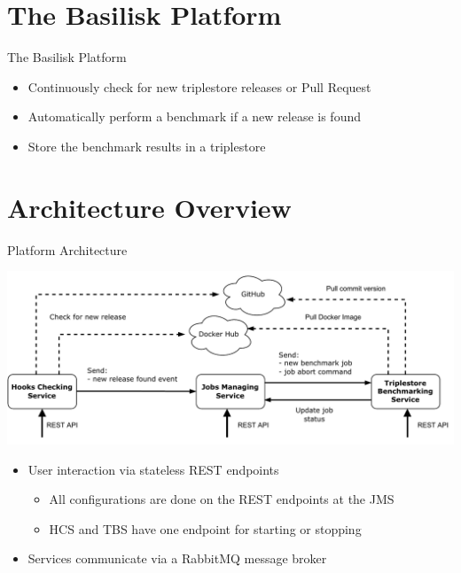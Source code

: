 \section{The Basilisk Platform}
\begin{frame}{The Basilisk Platform}
	\begin{itemize}
		\item Continuously check for new triplestore releases or Pull Request
		\item Automatically perform a benchmark if a new release is found
		\item Store the benchmark results in a triplestore
	\end{itemize}
	
	
\end{frame}

\section{Architecture Overview}
\begin{frame}{Platform Architecture}
	\centering
	
	\includegraphics[width=1\textwidth]{images/basilisk/high-level-design-approach.pdf}
	
	\begin{itemize}
		\item User interaction via stateless REST endpoints
		\begin{itemize}
			\item All configurations are done on the REST endpoints at the JMS
			\item HCS and TBS have one endpoint for starting or stopping
		\end{itemize}
		\item Services communicate via a RabbitMQ message broker
	\end{itemize}
	
\end{frame}